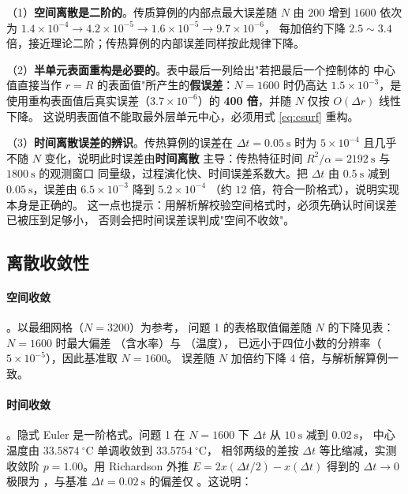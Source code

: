 （1）\textbf{空间离散是二阶的}。传质算例的内部点最大误差随 $N$ 由 $200$ 增到
$1600$ 依次为 $1.4\times10^{-4}\to4.2\times10^{-5}\to1.6\times10^{-5}\to9.7\times10^{-6}$，
每加倍约下降 $2.5\sim3.4$ 倍，接近理论二阶；传热算例的内部误差同样按此规律下降。

（2）\textbf{半单元表面重构是必要的}。表中最后一列给出"若把最后一个控制体的
中心值直接当作 $r=R$ 的表面值"所产生的\textbf{假误差}：$N=1600$ 时仍高达
$1.5\times10^{-3}$，是使用重构表面值后真实误差（$3.7\times10^{-6}$）的
\textbf{400 倍}，并随 $N$ 仅按 $O(\Delta r)$ 线性下降。
这说明表面值不能取最外层单元中心，必须用式 \eqref{eq:csurf} 重构。

（3）\textbf{时间离散误差的辨识}。传热算例的误差在 $\Delta t=0.05\ \mathrm{s}$
时为 $5\times10^{-4}$ 且几乎不随 $N$ 变化，说明此时误差由\textbf{时间离散}
主导：传热特征时间 $R^2/\alpha=2192\ \mathrm{s}$ 与 $1800\ \mathrm{s}$ 的观测窗口
同量级，过程演化快、时间误差系数大。把 $\Delta t$ 由 $0.5\ \mathrm{s}$ 减到
$0.05\ \mathrm{s}$，误差由 $6.5\times10^{-3}$ 降到 $5.2\times10^{-4}$
（约 $12$ 倍，符合一阶格式），说明实现本身是正确的。
这一点也提示：用解析解校验空间格式时，必须先确认时间误差已被压到足够小，
否则会把时间误差误判成"空间不收敛"。

\subsection{离散收敛性}

\paragraph{空间收敛}。以最细网格（$N=3200$）为参考，
问题 1 的表格取值偏差随 $N$ 的下降见表：$N=1600$ 时最大偏差
（含水率）与 （温度），
已远小于四位小数的分辨率（$5\times10^{-5}$），因此基准取 $N=1600$。
误差随 $N$ 加倍约下降 4 倍，与解析解算例一致。

\paragraph{时间收敛}。隐式 Euler 是一阶格式。问题 1 在 $N=1600$ 下
$\Delta t$ 从 $10\ \mathrm{s}$ 减到 $0.02\ \mathrm{s}$，
中心温度由 $33.5874\ ^\circ\mathrm{C}$ 单调收敛到 $33.5754\ ^\circ\mathrm{C}$，
相邻两级的差按 $\Delta t$ 等比缩减，实测收敛阶
$p=\text{1.00}$。用 Richardson 外推
$E=2x(\Delta t/2)-x(\Delta t)$ 得到的 $\Delta t\to0$ 极限为
，与基准 $\Delta t=0.02\ \mathrm{s}$ 的偏差仅
。这说明：

